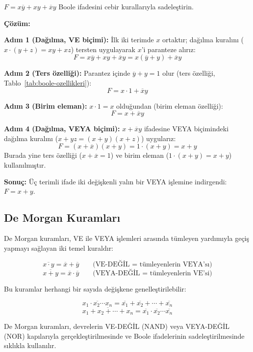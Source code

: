 \begin{ornek}[B.1]
$F = x\overline{y} + xy + \overline{x}y$ Boole ifadesini cebir kurallarıyla sadeleştirin.

\textbf{Çözüm:}

\textbf{Adım 1 (Dağılma, VE biçimi):} İlk iki terimde $x$ ortaktır; dağılma kuralını ($x \cdot (y+z) = xy + xz$) tersten uygulayarak $x$'i paranteze alırız:
\[
F = x\overline{y} + xy + \overline{x}y = x(\overline{y} + y) + \overline{x}y
\]

\textbf{Adım 2 (Ters özelliği):} Parantez içinde $\overline{y} + y = 1$ olur (ters özelliği, Tablo~\ref{tab:boole-ozellikleri}):
\[
F = x \cdot 1 + \overline{x}y
\]

\textbf{Adım 3 (Birim eleman):} $x \cdot 1 = x$ olduğundan (birim eleman özelliği):
\[
F = x + \overline{x}y
\]

\textbf{Adım 4 (Dağılma, VEYA biçimi):} $x + \overline{x}y$ ifadesine VEYA biçimindeki dağılma kuralını ($x + yz = (x+y)(x+z)$) uygularız:
\[
F = (x + \overline{x})(x + y) = 1 \cdot (x + y) = x + y
\]
Burada yine ters özelliği ($x + \overline{x} = 1$) ve birim eleman ($1 \cdot (x+y) = x+y$) kullanılmıştır.

\textbf{Sonuç:} Üç terimli ifade iki değişkenli yalın bir VEYA işlemine indirgendi: $F = x + y$.
\end{ornek}

\subsection{De Morgan Kuramları}

De Morgan kuramları, VE ile VEYA işlemleri arasında tümleyen yardımıyla geçiş yapmayı sağlayan iki temel kuraldır:

\[
\overline{x \cdot y} = \overline{x} + \overline{y} \qquad \text{(VE-DEĞİL = tümleyenlerin VEYA'sı)}
\]
\[
\overline{x + y} = \overline{x} \cdot \overline{y} \qquad \text{(VEYA-DEĞİL = tümleyenlerin VE'si)}
\]

Bu kuramlar herhangi bir sayıda değişkene genelleştirilebilir:

\[
\overline{x_1 \cdot x_2 \cdots x_n} = \overline{x_1} + \overline{x_2} + \cdots + \overline{x_n}
\]
\[
\overline{x_1 + x_2 + \cdots + x_n} = \overline{x_1} \cdot \overline{x_2} \cdots \overline{x_n}
\]

De Morgan kuramları, devrelerin VE-DEĞİL (NAND) veya VEYA-DEĞİL (NOR) kapılarıyla gerçekleştirilmesinde ve Boole ifadelerinin sadeleştirilmesinde sıklıkla kullanılır.

